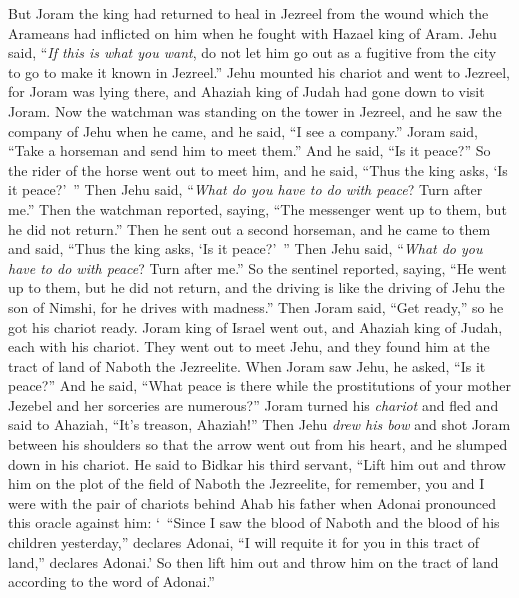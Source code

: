 \begin{biblechapter}
\verse But Joram the king had returned to heal in Jezreel from the wound which the Arameans had inflicted on him when he fought with Hazael king of Aram. Jehu said, “\textit{If this is what you want}, do not let him go out as a fugitive from the city to go to make it known in Jezreel.”
\verse Jehu mounted his chariot and went to Jezreel, for Joram was lying there, and Ahaziah king of Judah had gone down to visit Joram.
\verse Now the watchman was standing on the tower in Jezreel, and he saw the company of Jehu when he came, and he said, “I see a company.” Joram said, “Take a horseman and send him to meet them.” And he said, “Is it peace?”
\verse So the rider of the horse went out to meet him, and he said, “Thus the king asks, ‘Is it peace?’ ” Then Jehu said, “\textit{What do you have to do with peace}? Turn after me.” Then the watchman reported, saying, “The messenger went up to them, but he did not return.”
\verse Then he sent out a second horseman, and he came to them and said, “Thus the king asks, ‘Is it peace?’ ” Then Jehu said, “\textit{What do you have to do with peace}? Turn after me.”
\verse So the sentinel reported, saying, “He went up to them, but he did not return, and the driving is like the driving of Jehu the son of Nimshi, for he drives with madness.”
\verse Then Joram said, “Get ready,” so he got his chariot ready. Joram king of Israel went out, and Ahaziah king of Judah, each with his chariot. They went out to meet Jehu, and they found him at the tract of land of Naboth the Jezreelite.
\verse When Joram saw Jehu, he asked, “Is it peace?” And he said, “What peace is there while the prostitutions of your mother Jezebel and her sorceries are numerous?”
\verse Joram turned his \textit{chariot} and fled and said to Ahaziah, “It’s treason, Ahaziah!”
\verse Then Jehu \textit{drew his bow} and shot Joram between his shoulders so that the arrow went out from his heart, and he slumped down in his chariot.
\verse He said to Bidkar his third servant, “Lift him out and throw him on the plot of the field of Naboth the Jezreelite, for remember, you and I were with the pair of chariots behind Ahab his father when Adonai pronounced this oracle against him:
\verse ‘ “Since I saw the blood of Naboth and the blood of his children yesterday,” declares Adonai, “I will requite it for you in this tract of land,” declares Adonai.’ So then lift him out and throw him on the tract of land according to the word of Adonai.”

\end{biblechapter}
